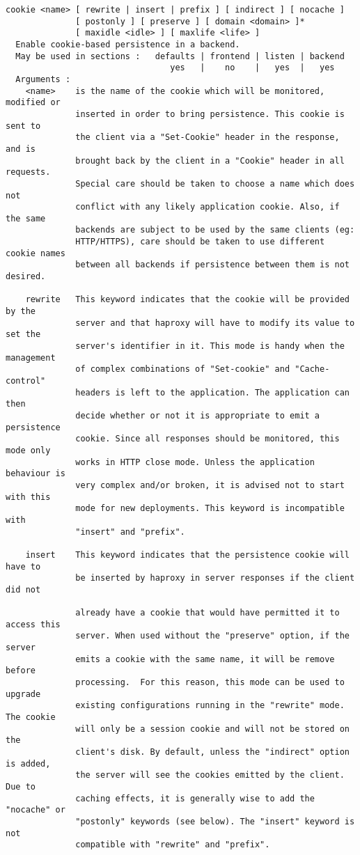 \begin{verbatim}
cookie <name> [ rewrite | insert | prefix ] [ indirect ] [ nocache ]
              [ postonly ] [ preserve ] [ domain <domain> ]*
              [ maxidle <idle> ] [ maxlife <life> ]
  Enable cookie-based persistence in a backend.
  May be used in sections :   defaults | frontend | listen | backend
                                 yes   |    no    |   yes  |   yes
  Arguments :
    <name>    is the name of the cookie which will be monitored, modified or
              inserted in order to bring persistence. This cookie is sent to
              the client via a "Set-Cookie" header in the response, and is
              brought back by the client in a "Cookie" header in all requests.
              Special care should be taken to choose a name which does not
              conflict with any likely application cookie. Also, if the same
              backends are subject to be used by the same clients (eg:
              HTTP/HTTPS), care should be taken to use different cookie names
              between all backends if persistence between them is not desired.

    rewrite   This keyword indicates that the cookie will be provided by the
              server and that haproxy will have to modify its value to set the
              server's identifier in it. This mode is handy when the management
              of complex combinations of "Set-cookie" and "Cache-control"
              headers is left to the application. The application can then
              decide whether or not it is appropriate to emit a persistence
              cookie. Since all responses should be monitored, this mode only
              works in HTTP close mode. Unless the application behaviour is
              very complex and/or broken, it is advised not to start with this
              mode for new deployments. This keyword is incompatible with
              "insert" and "prefix".

    insert    This keyword indicates that the persistence cookie will have to
              be inserted by haproxy in server responses if the client did not

              already have a cookie that would have permitted it to access this
              server. When used without the "preserve" option, if the server
              emits a cookie with the same name, it will be remove before
              processing.  For this reason, this mode can be used to upgrade
              existing configurations running in the "rewrite" mode. The cookie
              will only be a session cookie and will not be stored on the
              client's disk. By default, unless the "indirect" option is added,
              the server will see the cookies emitted by the client. Due to
              caching effects, it is generally wise to add the "nocache" or
              "postonly" keywords (see below). The "insert" keyword is not
              compatible with "rewrite" and "prefix".


\end{verbatim}
